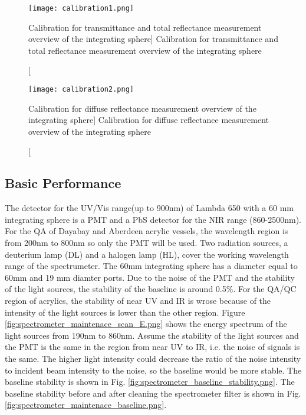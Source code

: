 \begin{figure}
    \centering
    \texttt{[image: calibration1.png]}
    \caption
    [Calibration for transmittance and total reflectance measurement overview of the integrating sphere]
    {Calibration for transmittance and total reflectance measurement overview of the integrating sphere}
    \label{fig:calibration1.png}
    \end{figure}

\begin{figure}
    \centering
    \texttt{[image: calibration2.png]}
    \caption
    [Calibration for diffuse reflectance measurement overview of the integrating sphere]
    {Calibration for diffuse reflectance measurement overview of the integrating sphere}
    \label{fig:calibration2.png}
    \end{figure}



\subsection{Basic Performance}

The detector for the UV/Vis range(up to 900nm) of Lambda 650 with a 60 mm integrating sphere
is a PMT and a PbS detector for the NIR range (860-2500nm). For the QA of Dayabay and Aberdeen acrylic vessels, the wavelength region is from
200nm to 800nm so only the PMT will be used.
Two radiation sources, a deuterium lamp (DL) and a halogen lamp (HL), cover the working wavelength range of the spectrumeter.
The 60mm integrating sphere has a diameter equal to 60mm and 19 mm diamter ports.
Due to the noise of the PMT and the stability of the
light sources, the stability of the baseline is around 0.5\%.
For the QA/QC region of acrylics, the stability of near UV and IR is wrose because
of the intensity of the light sources is lower than the other region.
Figure \ref{fig:spectrometer_maintenace_scan_E.png} shows the energy spectrum of the light sources from 190nm to
860nm. Assume the stability of the light sources and the PMT is the same in
the region from near UV to IR, i.e. the noise of signals is the same. The higher
light intensity could decrease the ratio of the noise intensity to incident beam intensity to the noise,
so the baseline would be more stable. The baseline stability is shown in Fig. \ref{fig:spectrometer_baseline_stability.png}.
The baseline stability before and after cleaning the spectrometer filter is shown in Fig. \ref{fig:spectrometer_maintenace_baseline.png}.


